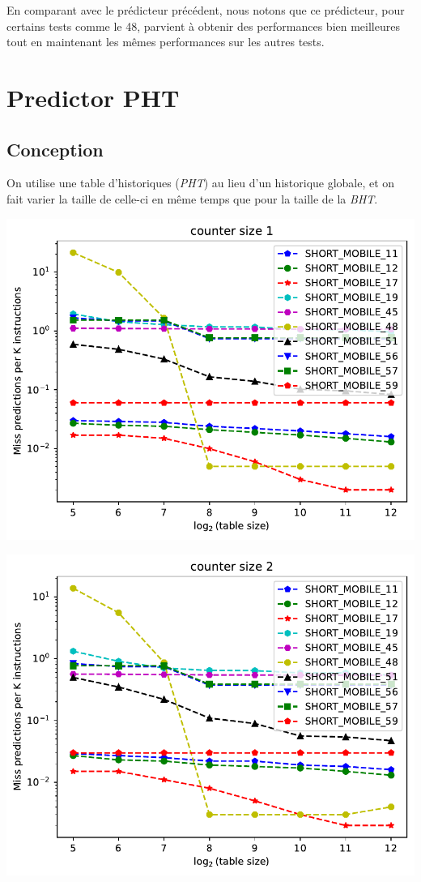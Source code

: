 \documentclass[a4paper]{article}
\begin{document}
En comparant avec le prédicteur précédent, nous notons que ce prédicteur, pour certains tests comme le 48, parvient à obtenir des performances bien meilleures tout en maintenant les mêmes performances sur les autres tests.

\section{Predictor PHT}
\subsection{Conception}
On utilise une table d'historiques (\textit{PHT}) au lieu d'un historique globale, et on fait varier la taille de celle-ci en même temps que pour la taille de la \textit{BHT}.

\begin{minipage}{.48\linewidth}
\includegraphics[width=\linewidth]{pht/graph_1}
\end{minipage}%
\hfill
\begin{minipage}{.48\linewidth}
\includegraphics[width=\linewidth]{pht/graph_2}
\end{minipage}
\end{document}
